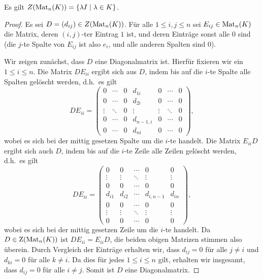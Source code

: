 \documentclass[a4paper, 10pt, numbers=noenddot]{scrartcl}
\begin{document}
\begin{lemma}
  \label{lem: center of matrix rings}
  Es gilt $Z(\operatorname{Mat}_n(K)) = \{ \lambda I \mid \lambda \in K\}$.
\end{lemma}
\begin{proof}
  Es sei $D = (d_{ij}) \in Z(\operatorname{Mat}_n(K))$.
  Für alle $1 \leq i,j \leq n$ sei $E_{ij} \in \operatorname{Mat}_n(K)$ die Matrix, deren $(i,j)$-ter Eintrag $1$ ist, und deren Einträge sonst alle $0$ sind (die $j$-te Spalte von $E_{ij}$ ist also $e_i$, und alle anderen Spalten sind $0$).
  
  Wir zeigen zunächst, dass $D$ eine Diagonalmatrix ist.
  Hierfür fixieren wir ein $1 \leq i \leq n$.
  Die Matrix $D E_{ii}$ ergibt sich aus $D$, indem bis auf die $i$-te Spalte alle Spalten gelöscht werden, d.h.\ es gilt
  \[
      D E_{ii}
    = \begin{pmatrix}
        0       & \cdots  & 0 & d_{1i}    & 0       & \cdots  & 0  \\
        0       & \cdots  & 0 & d_{2i}    & 0       & \cdots  & 0  \\
        \vdots  & \ddots  & 0 & \vdots    & \vdots  & \ddots  & 0  \\
        0       & \cdots  & 0 & d_{n-1,i} & 0       & \cdots  & 0  \\
        0       & \cdots  & 0 & d_{ni}    & 0       & \cdots  & 0
      \end{pmatrix},
  \]
  wobei es sich bei der mittig gesetzen Spalte um die $i$-te handelt.
  Die Matrix $E_{ii} D$ ergibt sich auch $D$, indem bis auf die $i$-te Zeile alle Zeilen gelöscht werden, d.h.\ es gilt
  \[
      D E_{ii}
    = \begin{pmatrix}
        0       & 0       & \cdots  & 0         & 0       \\
        \vdots  & \vdots  & \ddots  & \vdots    & \vdots  \\
        0       & 0       & \cdots  & 0         & 0       \\
        d_{i1}  & d_{i2}  & \cdots  & d_{i,n-1} & d_{in}  \\
        0       & 0       & \cdots  & 0         & 0       \\
        \vdots  & \vdots  & \ddots  & \vdots    & \vdots  \\
        0       & 0       & \cdots  & 0         & 0
      \end{pmatrix},
  \]
  wobei es sich bei der mittig gesetzen Zeile um die $i$-te handelt.
  Da $D \in \operatorname{Z}(\operatorname{Mat}_n(K))$ ist $D E_{ii} = E_{ii} D$, die beiden obigen Matrizen stimmen also überein.
  Durch Vergleich der Einträge erhalten wir, dass $d_{ij} = 0$ für alle $j \neq i$ und $d_{ki} = 0$ für alle $k \neq i$.
  Da dies für jedes $1 \leq i \leq n$ gilt, erhalten wir insgesamt, dass $d_{ij} = 0$ für alle $i \neq j$.
  Somit ist $D$ eine Diagonalmatrix.
  

\end{proof}
\end{document}
